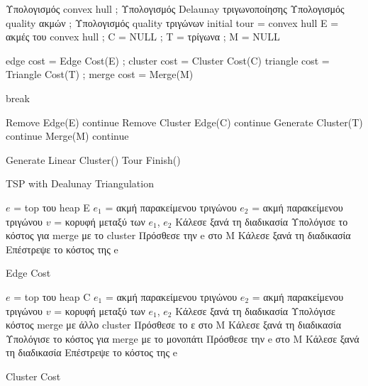 \documentclass[oneside,12pt]{book}
\theoremstyle{definition}
\begin{document}
\begin{algorithm}[H]
	\SetAlgoLined

	Υπολογισμός convex hull ;	
	Υπολογισμός Delaunay τριγωνοποίησης \;
	Υπολογισμός quality ακμών ;
	Υπολογισμός quality τριγώνων \;
	initial tour = convex hull \;
	Ε = ακμές του convex hull ;
	C = NULL ;
	T = τρίγωνα ;
	M = NULL \;
	{edge cost = Edge Cost(E) ;
	cluster cost = Cluster Cost(C) \;
	triangle cost = Triangle Cost(T) ;
	merge cost = Merge(M) \;

	{break \;}
	
	{Remove Edge(E) \;
	continue \;}
	{Remove Cluster Edge(C) \;
	continue \;}
	{Generate Cluster(T) \;
	continue \;}
	{Merge(M) \;
	continue \;}}	

	Generate Linear Cluster() \;
	Tour Finish() \;
	
	\caption{TSP with Dealunay Triangulation}
\end{algorithm}

\newpage

\begin{algorithm}[H]
	\SetAlgoLined
	
	\(e\) = top του heap Ε \;
	\(e_1\) = ακμή παρακείμενου τριγώνου \;
	\(e_2\) = ακμή παρακείμενου τριγώνου \;	
	\(v\) = κορυφή μεταξύ των \(e_1\), \(e_2\) \;
	{Κάλεσε ξανά τη διαδικασία \;}
	{Υπολόγισε το κόστος για merge με το cluster \;
	Πρόσθεσε την e στο Μ \;
	Κάλεσε ξανά τη διαδικασία \;}
	Επέστρεψε το κόστος της e \;
	
	\caption{Edge Cost}
\end{algorithm}

\newpage

\begin{algorithm}[H]
	\SetAlgoLined
	
	\(e\) = top του heap C \;
	\(e_1\) = ακμή παρακείμενου τριγώνου \;
	\(e_2\) = ακμή παρακείμενου τριγώνου \;	
	\(v\) = κορυφή μεταξύ των \(e_1\), \(e_2\) \;
	{
		{Κάλεσε ξανά τη διαδικασία \;}}
	Υπολόγισε κόστος merge με άλλο cluster \;
	Πρόσθεσε το ε στο Μ \;
	Κάλεσε ξανά τη διαδικασία \;
	{Υπολόγισε το κόστος για merge με το μονοπάτι \;
		Πρόσθεσε την e στο Μ \;
		Κάλεσε ξανά τη διαδικασία \;}
	Επέστρεψε το κόστος της e \;
	
	\caption{Cluster Cost}
\end{algorithm}
\end{document}
